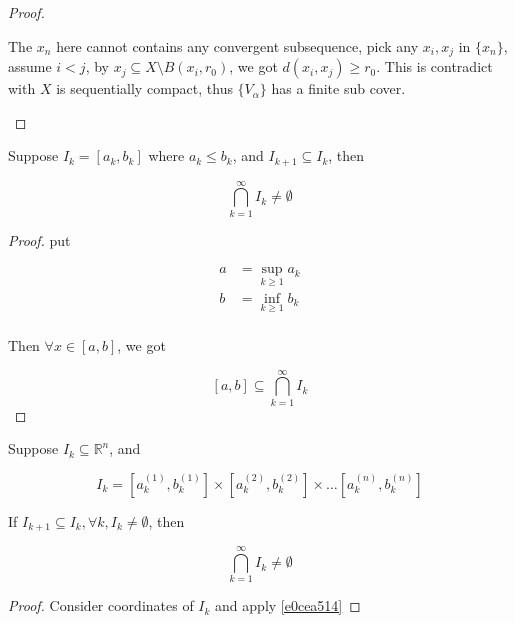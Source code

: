 \begin{proof}
\begin{enumerate}
The $x_n$ here cannot contains any convergent subsequence, pick any $x_i, x_j$ in $\{ x_n \}$,
assume $i < j$, by $x_j \subseteq X \setminus B(x_i, r_0)$, we got $d(x_i, x_j) \ge r_0$.
This is contradict with $X$ is sequentially compact, thus $\{V_\alpha\}$ has a finite sub cover.

    \end{enumerate}

\end{proof}


\begin{thm}\label{e0cea514}
    Suppose $I_k = [a_k, b_k]$ where $a_k \le b_k$, and $I_{k+1} \subseteq I_k$, then

    \[
        \bigcap_{k=1}^{\infty} I_k \ne \emptyset
    \]
\end{thm}

\begin{proof}
    put 
    
    \begin{align*}
        a &= \sup_{k \ge 1} a_k \\
        b &= \inf_{k \ge 1} b_k \\
    \end{align*}

    Then $\forall x \in [a,b]$, we got 

    \[
        [a,b] \subseteq \bigcap_{k=1}^{\infty}I_k
    \]
\end{proof}

\begin{corollary}
    Suppose $I_k \subseteq \mathbb{R}^n$, and

    \[
        I_k = [a^{(1)}_k, b^{(1)}_k] \times [a^{(2)}_k, b^{(2)}_k] \times \dots [a^{(n)}_k, b^{(n)}_k]
    \]

    If $I_{k+1} \subseteq I_{k}, \forall k, I_k \ne \emptyset$, then 

    \[
        \bigcap_{k=1}^{\infty} I_k \ne \emptyset
    \]
\end{corollary}

\begin{proof}
    Consider coordinates of $I_k$ and apply \cref{e0cea514}
\end{proof}

